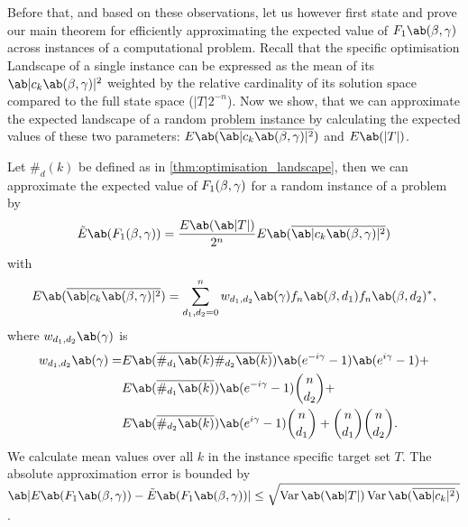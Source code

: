 Before that, and based on these observations, let us however first state and prove our main theorem for efficiently approximating the expected value of $F_1 \ab(\mangle, \pangle)$ across instances of a computational problem. Recall that the specific optimisation Landscape of a single instance can be expressed as the mean
of its $\ab|c_k \ab(\mangle, \pangle)|^2$ weighted by the relative cardinality of its solution space compared to the full state space ($|T| 2^{-n}$). Now we show, that we can approximate the expected landscape of a random problem instance by calculating the expected values of these two parameters: $E\ab(\overline{\ab|c_k \ab(\mangle, \pangle)|^2})$ and $E\ab(|T|)$.


\begin{theorem}
  \label{thm:approx}
     Let $\#_d (k)$ be defined as in \cref{thm:optimisation_landscape}, then we can approximate the expected value of $F_1 (\beta, \gamma)$ for a random instance of a problem by
  \begin{displaymath}
      \tilde{E}\ab(F_1 (\mangle, \pangle)) = \frac{E\ab(\ab|T|)}{2^n} E\ab(\overline{\ab|c_k\ab(\mangle,\pangle)|^2})
  \end{displaymath}
  with
  \begin{equation}
      \label{eq:E_ck_mean}
      E\ab(\overline{\ab|c_k\ab(\mangle,\pangle)|^2}) = \sum_{d_1, d_2 = 0}^n w_{d_1, d_2}\ab(\pangle) f_n \ab(\mangle, d_1) f_n \ab(\mangle, d_2)^* ,
  \end{equation}
    where $w_{d_1, d_2} \ab(\pangle)$ is
  \begin{displaymath}
  \begin{aligned}
      w_{d_1, d_2}\ab(\pangle) = &E\ab(\overline{\#_{d_1}\ab(k) \#_{d_2}\ab(k)}) \ab(e^{-i\pangle} - 1)\ab(e^{i\pangle} - 1) + \\
                                 &E\ab(\overline{\#_{d_1}\ab(k)}) \ab(e^{-i \pangle} - 1) \binom{n}{d_2} + \\
                                 &E\ab(\overline{\#_{d_2}\ab(k)}) \ab(e^{i \pangle} - 1) \binom{n}{d_1} + %
                                 \binom{n}{d_1} \binom{n}{d_2}.
  \end{aligned}
  \end{displaymath}
    We calculate mean values over all $k$ in the instance specific target set $T$. The absolute approximation error is bounded by $\ab|E\ab(F_1 \ab(\mangle, \pangle)) - \tilde{E}\ab(F_1 \ab(\mangle, \pangle))| \leq \sqrt{\Var\ab(\ab|T|) \Var\ab(\overline{\ab|c_k|^2})}$.
\end{theorem}

